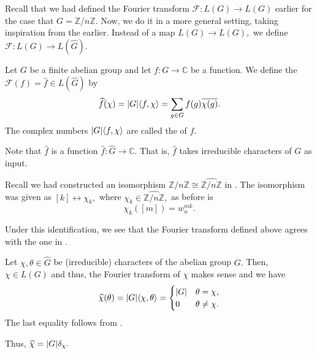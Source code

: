 \documentclass[12pt]{article}	%
\begin{document}
Recall that we had defined the Fourier transform $\mathcal{F} : L(G) \to L(G)$ earlier for the case that $G = \mathbb{Z}/n\mathbb{Z}.$ Now, we do it in a more general setting, taking inspiration from the earlier. Instead of a map $L(G) \to L(G),$ we define $\mathcal{F} : L(G) \to L(\widehat{G}).$ 

\begin{defn}
    Let $G$ be a finite abelian group and let $f : G \to \mathbb{C}$ be a function. We define the  $\mathcal{F}(f) = \widehat{f} \in L(\widehat{G})$ by 
    \begin{equation*}
        \widehat{f}(\chi) = {\left\lvert G \right\lvert}\langle f, \chi\rangle = \sum_{g \in G}f(g) \overline{\chi(g)}.
    \end{equation*}
    The complex numbers ${\left\lvert G \right\lvert}\langle f, \chi\rangle$ are called the  of $f.$
\end{defn}

Note that $\widehat{f}$ is a function $\widehat{f} : \widehat{G} \to \mathbb{C}.$ That is, $\widehat{f}$ takes irreducible characters of $G$ as input.

\begin{rem}
    Recall we had constructed an isomorphism $\mathbb{Z}/n\mathbb{Z} \cong \widehat{\mathbb{Z}/n\mathbb{Z}}$ in . The isomorphism was given as $[k] \leftrightarrow \chi_k,$ where $\chi_k \in \widehat{\mathbb{Z}/n\mathbb{Z}},$ as before is
    \begin{equation*} 
        \chi_k([m]) = w_n^{mk}.
    \end{equation*}

    Under this identification, we see that the Fourier transform defined above agrees with the one in .
\end{rem}

\begin{ex} \label{ex:fourtranschar}
    Let $\chi, \theta \in \widehat{G}$ be (irreducible) characters of the abelian group $G.$ Then, $\chi \in L(G)$ and thus, the Fourier transform of $\chi$ makes sense and we have
    \begin{equation*}
        \widehat{\chi}(\theta) = {\left\lvert G \right\lvert} \langle \chi, \theta\rangle = 
        \begin{cases}
            {\left\lvert G \right\lvert} & \theta = \chi, \\
            0 & \theta \neq \chi.
        \end{cases}
    \end{equation*}
    The last equality follows from .
    
    Thus, $\widehat{\chi} = {\left\lvert G \right\lvert} \delta_\chi.$
\end{ex}
\end{document}
